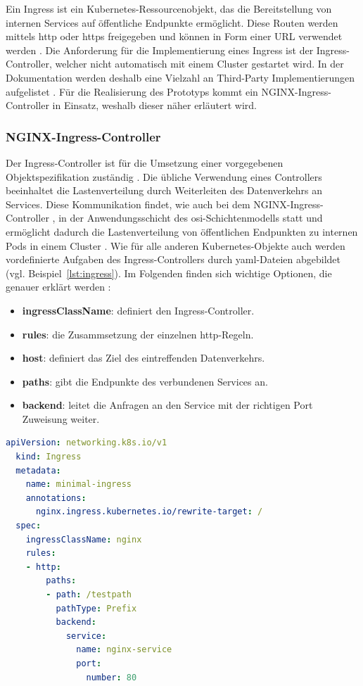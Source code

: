 Ein Ingress ist ein Kubernetes-Ressourcenobjekt, das die Bereitstellung von internen Services auf öffentliche Endpunkte ermöglicht.
Diese Routen werden mittels \acs{http} oder \acs{https} freigegeben und können in Form einer URL verwendet werden \cite{kubernetesingress}.
Die Anforderung für die Implementierung eines Ingress ist der Ingress-Controller, welcher nicht automatisch mit einem Cluster gestartet wird. 
In der Dokumentation werden deshalb eine Vielzahl an Third-Party Implementierungen aufgelistet \cite{kubernetesingresscontroller}. 
Für die Realisierung des Prototyps kommt ein NGINX-Ingress-Controller in Einsatz, weshalb dieser näher erläutert wird.

\subsubsection{NGINX-Ingress-Controller}
Der Ingress-Controller ist für die Umsetzung einer vorgegebenen Objektspezifikation zuständig \cite{kubernetesingress}.
Die übliche Verwendung eines Controllers beeinhaltet die Lastenverteilung durch Weiterleiten des Datenverkehrs an Services. 
Diese Kommunikation findet, wie auch bei dem NGINX-Ingress-Controller \cite{kubernetesingresscontrollerlayer}, in der Anwendungsschicht des \acs{osi}-Schichtenmodells statt und ermöglicht dadurch die 
Lastenverteilung von öffentlichen Endpunkten zu internen Pods in einem Cluster \cite{kubernetesingressibm}.
Wie für alle anderen Kubernetes-Objekte auch werden vordefinierte Aufgaben des Ingress-Controllers durch \acs{yaml}-Dateien abgebildet (vgl. Beispiel~\ref{lst:ingress}).
Im Folgenden finden sich wichtige Optionen, die genauer erklärt werden \cite{kubernetesingress}:

\begin{itemize}
  \item \textbf{ingressClassName}: definiert den Ingress-Controller.
  \item \textbf{rules}: die Zusammsetzung der einzelnen \acs{http}-Regeln.
  \item \textbf{host}: definiert das Ziel des eintreffenden Datenverkehrs.
  \item \textbf{paths}: gibt die Endpunkte des verbundenen Services an.
  \item \textbf{backend}: leitet die Anfragen an den Service mit der richtigen Port Zuweisung weiter.
\end{itemize}

\begin{lstlisting}[caption={ingress.yaml \cite{kubernetesingress} },captionpos=b,label={lst:ingress},language=yaml]
  apiVersion: networking.k8s.io/v1
  kind: Ingress
  metadata:
    name: minimal-ingress
    annotations:
      nginx.ingress.kubernetes.io/rewrite-target: /
  spec:
    ingressClassName: nginx
    rules:
    - http:
        paths:
        - path: /testpath
          pathType: Prefix
          backend:
            service:
              name: nginx-service
              port:
                number: 80
  \end{lstlisting}
